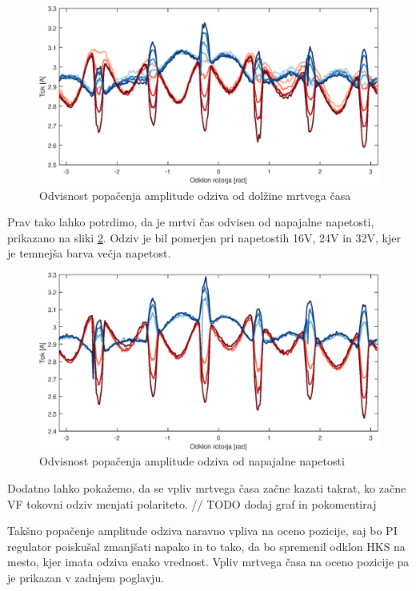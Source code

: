 \documentclass[a4paper,twoside,openright,12pt,slovene]{book}
\begin{document}
\begin{figure}[!htbp]
    \centering
    \includegraphics[width=1\columnwidth]{Slike/mrtviCas.eps}
    \caption{\label{mrtviCas} Odvisnost popačenja amplitude odziva od dolžine mrtvega časa}
\end{figure}

Prav tako lahko potrdimo, da je mrtvi čas odvisen od napajalne napetosti, prikazano na sliki \ref{mrtviCasNapetost}. Odziv je bil pomerjen pri napetostih 16V, 24V in 32V, kjer je temnejša barva večja
napetost.


\begin{figure}[!htbp]
    \centering
    \includegraphics[width=1\columnwidth]{Slike/mrtviCasNapetost.eps}
    \caption{\label{mrtviCasNapetost} Odvisnost popačenja amplitude odziva od napajalne napetosti }
\end{figure}

Dodatno lahko pokažemo, da se vpliv mrtvega časa začne kazati takrat, ko začne VF tokovni odziv menjati polariteto. // TODO dodaj graf in pokomentiraj

Takšno popačenje amplitude odziva naravno vpliva na oceno pozicije, saj bo PI regulator poiskušal zmanjšati napako in to tako, da bo spremenil odklon HKS na mesto, kjer imata odziva enako vrednost.
Vpliv mrtvega časa na oceno pozicije pa je prikazan v zadnjem poglavju.
\end{document}

